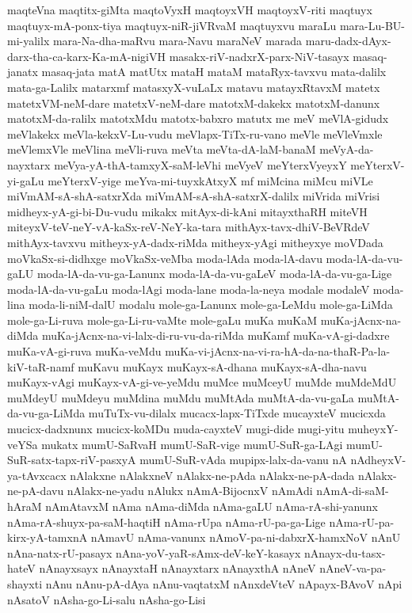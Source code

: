 {maqteVna
maqtitx-giMta
maqtoVyxH
maqtoyxVH
maqtoyxV-riti
maqtuyx
maqtuyx-mA-ponx-tiya
maqtuyx-niR-jiVRvaM
maqtuyxvu
maraLu
mara-Lu-BU-mi-yalilx
mara-Na-dha-maRvu
mara-Navu
maraNeV
marada
maru-dadx-dAyx-darx-tha-ca-karx-Ka-mA-nigiVH
masakx-riV-nadxrX-parx-NiV-tasayx
masaq-janatx
masaq-jata
matA
matUtx
mataH
mataM
mataRyx-tavxvu
mata-dalilx
mata-ga-Lalilx
matarxmf
matasxyX-vuLaLx
matavu
matayxRtavxM
matetx
matetxVM-neM-dare
matetxV-neM-dare
matotxM-dakekx
matotxM-danunx
matotxM-da-ralilx
matotxMdu
matotx-babxro
matutx
me
meV
meVlA-gidudx
meVlakekx
meVla-kekxV-Lu-vudu
meVlapx-TiTx-ru-vano
meVle
meVleVmxle
meVlemxVle
meVlina
meVli-ruva
meVta
meVta-dA-laM-banaM
meVyA-da-nayxtarx
meVya-yA-thA-tamxyX-saM-leVhi
meVyeV
meYterxVyeyxY
meYterxV-yi-gaLu
meYterxV-yige
meYva-mi-tuyxkAtxyX
mf
miMcina
miMcu
miVLe
miVmAM-sA-shA-satxrXda
miVmAM-sA-shA-satxrX-dalilx
miVrida
miVrisi
midheyx-yA-gi-bi-Du-vudu
mikakx
mitAyx-di-kAni
mitayxthaRH
miteVH
miteyxV-teV-neY-vA-kaSx-reV-NeY-ka-tara
mithAyx-tavx-dhiV-BeVRdeV
mithAyx-tavxvu
mitheyx-yA-dadx-riMda
mitheyx-yAgi
mitheyxye
moVDada
moVkaSx-si-didhxge
moVkaSx-veMba
moda-lAda
moda-lA-davu
moda-lA-da-vu-gaLU
moda-lA-da-vu-ga-Lanunx
moda-lA-da-vu-gaLeV
moda-lA-da-vu-ga-Lige
moda-lA-da-vu-gaLu
moda-lAgi
moda-lane
moda-la-neya
modale
modaleV
moda-lina
moda-li-niM-dalU
modalu
mole-ga-Lanunx
mole-ga-LeMdu
mole-ga-LiMda
mole-ga-Li-ruva
mole-ga-Li-ru-vaMte
mole-gaLu
muKa
muKaM
muKa-jAcnx-na-diMda
muKa-jAcnx-na-vi-lalx-di-ru-vu-da-riMda
muKamf
muKa-vA-gi-dadxre
muKa-vA-gi-ruva
muKa-veMdu
muKa-vi-jAcnx-na-vi-ra-hA-da-na-thaR-Pa-la-kiV-taR-namf
muKavu
muKayx
muKayx-sA-dhana
muKayx-sA-dha-navu
muKayx-vAgi
muKayx-vA-gi-ve-yeMdu
muMce
muMceyU
muMde
muMdeMdU
muMdeyU
muMdeyu
muMdina
muMdu
muMtAda
muMtA-da-vu-gaLa
muMtA-da-vu-ga-LiMda
muTuTx-vu-dilalx
mucacx-lapx-TiTxde
mucayxteV
mucicxda
mucicx-dadxnunx
mucicx-koMDu
muda-cayxteV
mugi-dide
mugi-yitu
muheyxY-veYSa
mukatx
mumU-SaRvaH
mumU-SaR-vige
mumU-SuR-ga-LAgi
mumU-SuR-satx-tapx-riV-pasxyA
mumU-SuR-vAda
mupipx-lalx-da-vanu
nA
nAdheyxV-ya-tAvxcacx
nAlakxne
nAlakxneV
nAlakx-ne-pAda
nAlakx-ne-pA-dada
nAlakx-ne-pA-davu
nAlakx-ne-yadu
nAlukx
nAmA-BijocnxV
nAmAdi
nAmA-di-saM-hAraM
nAmAtavxM
nAma
nAma-diMda
nAma-gaLU
nAma-rA-shi-yanunx
nAma-rA-shuyx-pa-saM-haqtiH
nAma-rUpa
nAma-rU-pa-ga-Lige
nAma-rU-pa-kirx-yA-tamxnA
nAmavU
nAma-vanunx
nAmoV-pa-ni-dabxrX-hamxNoV
nAnU
nAna-natx-rU-pasayx
nAna-yoV-yaR-sAmx-deV-keY-kasayx
nAnayx-du-tasx-hateV
nAnayxsayx
nAnayxtaH
nAnayxtarx
nAnayxthA
nAneV
nAneV-va-pa-shayxti
nAnu
nAnu-pA-dAya
nAnu-vaqtatxM
nAnxdeVteV
nApayx-BAvoV
nApi
nAsatoV
nAsha-go-Li-salu
nAsha-go-Lisi
}
